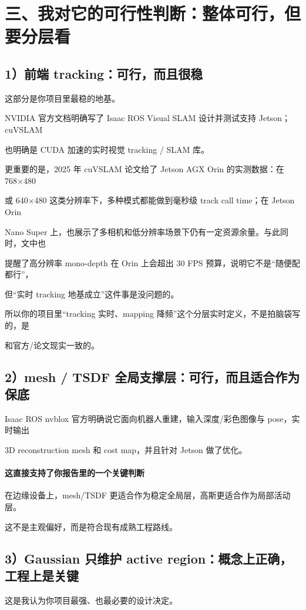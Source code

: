 \documentclass[12pt]{article}
\begin{document}
\section{三、我对它的可行性判断：整体可行，但要分层看}
\subsection{1）前端 tracking：可行，而且很稳}
这部分是你项目里最稳的地基。

NVIDIA 官方文档明确写了 Isaac ROS Visual SLAM 设计并测试支持 Jetson；cuVSLAM

也明确是 CUDA 加速的实时视觉 tracking / SLAM 库。

更重要的是，2025 年 cuVSLAM 论文给了 Jetson AGX Orin 的实测数据：在 768×480

或 640×480 这类分辨率下，多种模式都能做到毫秒级 track call time；在 Jetson Orin

Nano Super 上，也展示了多相机和低分辨率场景下仍有一定资源余量。与此同时，文中也

提醒了高分辨率 mono-depth 在 Orin 上会超出 30 FPS 预算，说明它不是“随便配都行”，

但“实时 tracking 地基成立”这件事是没问题的。

所以你的项目里“tracking 实时、mapping 降频”这个分层实时定义，不是拍脑袋写的，是

和官方/论文现实一致的。

\subsection{2）mesh / TSDF 全局支撑层：可行，而且适合作为保底}
Isaac ROS nvblox 官方明确说它面向机器人重建，输入深度/彩色图像与 pose，实时输出

3D reconstruction mesh 和 cost map，并且针对 Jetson 做了优化。

\paragraph{这直接支持了你报告里的一个关键判断}
在边缘设备上，mesh/TSDF 更适合作为稳定全局层，高斯更适合作为局部活动层。

这不是主观偏好，而是符合现有成熟工程路线。

\subsection{3）Gaussian 只维护 active region：概念上正确，工程上是关键}
这是我认为你项目最强、也最必要的设计决定。
\end{document}
